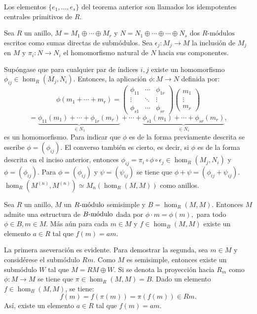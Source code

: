 \begin{definicion}
Los elementos $\{ e_1, \dots, e_s \}$ del  teorema anterior son llamados los idempotentes centrales primitivos de $R$.
\end{definicion}
\begin{lema}\label{lema:estructuraSemi}
Sea $R$ un anillo, $M = M_1 \oplus \cdots \oplus M_r$ y $N = N_1 \oplus \cdots \oplus \cdots \oplus N_s$ dos $R\mbox{-módulos}$ escritos como sumas directas de submódulos. Sea $\epsilon_j \colon M_j \to M$ la inclusión de $M_j$ en $M$ y $\pi_i \colon N \to N_i$ el homomorfismo natural de $N$ hacia sus componentes.
\begin{bulletList}
\newItem Supóngase que para cualquier par de índices $i,j$ existe un homomorfismo $\phi_{ij} \in \hom_R(M_j, N_i)$. Entonces,  la aplicación $\phi \colon M \to N$ definida por: \[\phi(m_1 + \cdots + m_r) = \begin{pmatrix}
\phi_{11} & \cdots & \phi_{1r} \\
\vdots & \ddots & \vdots \\
\phi_{s1} & \cdots & \phi_{sr}
\end{pmatrix} 
\begin{pmatrix}
m_1 \\
\vdots \\
m_r
\end{pmatrix}\]
\[ = \underset{\in N_1}{\underbrace{\phi_{11}(m_1) + \cdots + \phi_{1r}(m_r)}} +\cdots+\underset{\in N_s}{\underbrace{\phi_{s1}(m_1) + \cdots + \phi_{sr}(m_r)}}, \] es un homomorfismo. Para indicar que $\phi$ es de la forma previamente descrita se  escribe $\phi = (\phi_{ij})$. El converso también es cierto, es decir, si $\phi$ es de la forma descrita en el inciso anterior, entonces $\phi_{ij} = \pi_i\circ\phi\circ\epsilon_j \in \hom_R(M_j, N_i)$ y $\phi = (\phi_{ij})$.
\newItem Para $\phi = (\phi_{ij})$ y $\psi = (\psi_{ij})$ se tiene que $\phi + \psi = (\phi_{ij} +  \psi_{ij})$.
\newItem $\hom_R(M^{(n)}, M^{(n)}) \simeq M_n(\hom_R(M,M))$ como anillos. 
\end{bulletList} 
\end{lema}
\begin{lema}
Sea $R$ un anillo, $M$ un $\modulo{R}$ semisimple y $B= \hom_R(M,M)$. Entonces $M$  admite una estructura de $\modulo{B}$ dada por $\phi \cdot m = \phi(m),$ para todo $\phi \in B, m \in M$. Más aún para cada $m \in M$ y $f \in \hom_B(M,M)$ existe un elemento $a \in R$ tal que $f(m) = am$.  
\end{lema}
\begin{proof*}
La primera aseveración es evidente. Para demostrar la segunda, sea $m \in M$ y considérese el submódulo $Rm$. Como $M$ es semisimple, entonces existe un submódulo $W$ tal que $M = RM \oplus W$. Si se denota  la proyección hacia $R_m$ como $\phi \colon M \to M$ se tiene que $\pi \in \hom_R(M,M) = B$. Dado un elemento $f \in \hom_B(M,M)$, se tiene:\[ f(m) = f(\pi(m)) = \pi(f(m)) \in Rm. \] Así, existe un elemento $a \in R$ tal que $f(m) = am$. 
\end{proof*}

